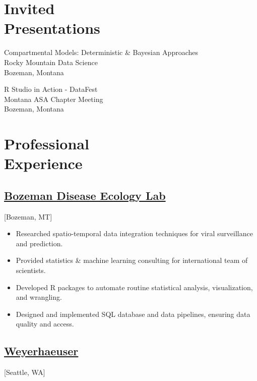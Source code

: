 \documentclass{wm_cv}
\begin{document}
\section{Invited \\ Presentations}

Compartmental Models: Deterministic \& Bayesian Approaches \\ 
    \indent \quad Rocky Mountain Data Science \hfill {} \\
   \indent \quad Bozeman, Montana
   
R Studio in Action - DataFest\\ 
    \indent \quad Montana ASA Chapter Meeting \hfill {} \\
   \indent \quad Bozeman, Montana

\section{Professional \\ Experience}
\subsection{\href{http://bzndiseaselab.org/}{Bozeman Disease Ecology Lab}}[Bozeman, MT]
\begin{positions}
\end{positions}

\begin{itemize}
  \item Researched spatio-temporal data integration techniques for viral surveillance and prediction.
  \item Provided statistics \& machine learning consulting for international team of scientists.
  \item Developed R packages to automate routine statistical analysis, visualization, and wrangling.
  \item Designed and implemented SQL database and data pipelines, ensuring data quality and access.
\end{itemize}


\subsection{\href{https://en.wikipedia.org/wiki/Weyerhaeuser}{Weyerhaeuser}}[Seattle, WA]
\begin{positions}
\end{positions}
\end{document}
